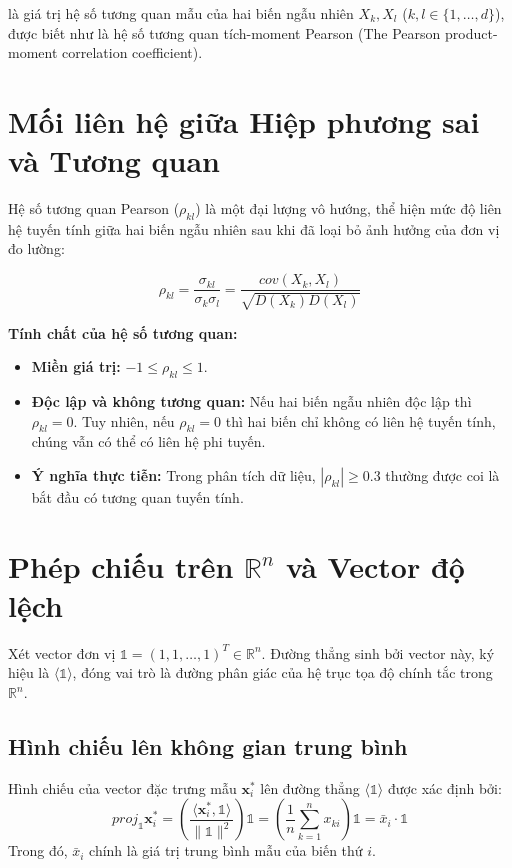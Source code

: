 \noindent là giá trị hệ số tương quan mẫu của hai biến ngẫu nhiên $X_k, X_l$ ($k, l \in \{1, \dots, d\}$), được biết như là hệ số tương quan tích-moment Pearson (The Pearson product-moment correlation coefficient).

\section{Mối liên hệ giữa Hiệp phương sai và Tương quan}

Hệ số tương quan Pearson ($\rho_{kl}$) là một đại lượng vô hướng, thể hiện mức độ liên hệ tuyến tính giữa hai biến ngẫu nhiên sau khi đã loại bỏ ảnh hưởng của đơn vị đo lường:

\[
\rho_{kl} = \frac{\sigma_{kl}}{\sigma_k \sigma_l} = \frac{cov(X_k, X_l)}{\sqrt{D(X_k) D(X_l)}}
\]

\noindent \textbf{Tính chất của hệ số tương quan:}
\begin{itemize}
    \item \textbf{Miền giá trị:} $-1 \leq \rho_{kl} \leq 1$.
    \item \textbf{Độc lập và không tương quan:} Nếu hai biến ngẫu nhiên độc lập thì $\rho_{kl} = 0$. Tuy nhiên, nếu $\rho_{kl} = 0$ thì hai biến chỉ không có liên hệ tuyến tính, chúng vẫn có thể có liên hệ phi tuyến.
    \item \textbf{Ý nghĩa thực tiễn:} Trong phân tích dữ liệu, $|\rho_{kl}| \geq 0.3$ thường được coi là bắt đầu có tương quan tuyến tính.
\end{itemize}

\section{Phép chiếu trên $\mathbb{R}^n$ và Vector độ lệch}

Xét vector đơn vị $\bm{\mathbb{1}} = (1, 1, \dots, 1)^T \in \mathbb{R}^n$. Đường thẳng sinh bởi vector này, ký hiệu là $\langle \bm{\mathbb{1}} \rangle$, đóng vai trò là đường phân giác của hệ trục tọa độ chính tắc trong $\mathbb{R}^n$.

\subsection{Hình chiếu lên không gian trung bình}
Hình chiếu của vector đặc trưng mẫu $\bm{x}^*_i$ lên đường thẳng $\langle \bm{\mathbb{1}} \rangle$ được xác định bởi:
\[
proj_{\bm{\mathbb{1}}} \bm{x}^*_i = \left( \frac{\langle \bm{x}^*_i, \bm{\mathbb{1}} \rangle}{\|\bm{\mathbb{1}}\|^2} \right) \bm{\mathbb{1}} = \left( \frac{1}{n} \sum_{k=1}^n x_{ki} \right) \bm{\mathbb{1}} = \bar{x}_i \cdot \bm{\mathbb{1}}
\]
\noindent Trong đó, $\bar{x}_i$ chính là giá trị trung bình mẫu của biến thứ $i$.

